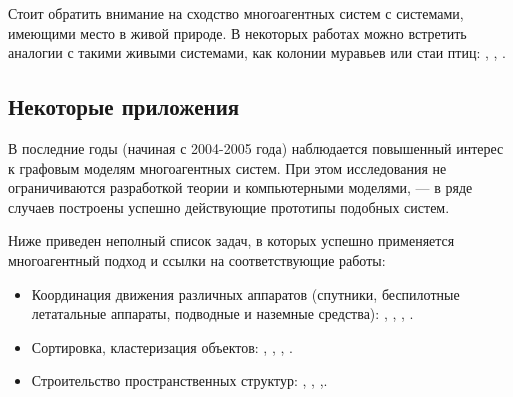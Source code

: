Стоит обратить внимание на сходство многоагентных систем с системами, имеющими место в живой природе. В некоторых работах можно встретить аналогии с такими живыми системами, как колонии муравьев или стаи птиц: \cite{petersen2014collective}, \cite{deneubourg1991dynamics}, \cite{basiri2013audio}.

\subsection*{Некоторые приложения}

В последние годы (начиная с 2004-2005 года) наблюдается
повышенный интерес к графовым моделям многоагентных систем. При этом исследования
не ограничиваются разработкой теории и компьютерными
моделями, --- в ряде случаев построены успешно
действующие прототипы подобных систем. 

Ниже приведен неполный список задач, в которых успешно  применяется многоагентный подход и ссылки на соответствующие работы:
\begin{itemize}
\item Координация движения различных аппаратов (спутники, беспилотные летатальные аппараты, подводные и наземные средства): \cite{lafferriere2005decentralized}, \cite{veerman2005flocks}, \cite{vasarhelyi2014outdoor}, \cite{williams2005stable}.
\item Сортировка, кластеризация объектов: \cite{deneubourg1991dynamics}, \cite{ding2014sorting}, \cite{kabla2012collective}, \cite{santos2014segregation}.
\item Строительство пространственных структур: \cite{pennisi2014cooperative}, \cite{petersen2014collective}, \cite{augugliaro2013building},\cite{lindsey2011construction}.
\end{itemize}

\clearpage